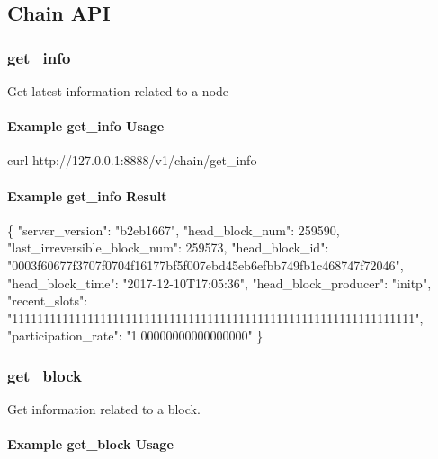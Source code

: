 \hypertarget{group__aaciorpc_chainrpc}{}\subsection{Chain A\+PI}\label{group__aaciorpc_chainrpc}
\hypertarget{group__aaciorpc_v1chaingetinfo}{}\subsubsection{get\+\_\+info}\label{group__aaciorpc_v1chaingetinfo}
Get latest information related to a node\hypertarget{group__aaciorpc_examplegetinfo}{}\paragraph{Example get\+\_\+info Usage}\label{group__aaciorpc_examplegetinfo}

\begin{DoxyCode}
curl http:\textcolor{comment}{//127.0.0.1:8888/v1/chain/get\_info}
\end{DoxyCode}
\hypertarget{group__aaciorpc_examplegetinforesult}{}\paragraph{Example get\+\_\+info Result}\label{group__aaciorpc_examplegetinforesult}

\begin{DoxyCode}
\{
  \textcolor{stringliteral}{"server\_version"}: \textcolor{stringliteral}{"b2eb1667"},
  \textcolor{stringliteral}{"head\_block\_num"}: 259590,
  \textcolor{stringliteral}{"last\_irreversible\_block\_num"}: 259573,
  \textcolor{stringliteral}{"head\_block\_id"}: \textcolor{stringliteral}{"0003f60677f3707f0704f16177bf5f007ebd45eb6efbb749fb1c468747f72046"},
  \textcolor{stringliteral}{"head\_block\_time"}: \textcolor{stringliteral}{"2017-12-10T17:05:36"},
  \textcolor{stringliteral}{"head\_block\_producer"}: \textcolor{stringliteral}{"initp"},
  \textcolor{stringliteral}{"recent\_slots"}: \textcolor{stringliteral}{"1111111111111111111111111111111111111111111111111111111111111111"},
  \textcolor{stringliteral}{"participation\_rate"}: \textcolor{stringliteral}{"1.00000000000000000"}
\}
\end{DoxyCode}
\hypertarget{group__aaciorpc_v1chaingetblock}{}\subsubsection{get\+\_\+block}\label{group__aaciorpc_v1chaingetblock}
Get information related to a block.\hypertarget{group__aaciorpc_examplegetblock}{}\paragraph{Example get\+\_\+block Usage}\label{group__aaciorpc_examplegetblock}

